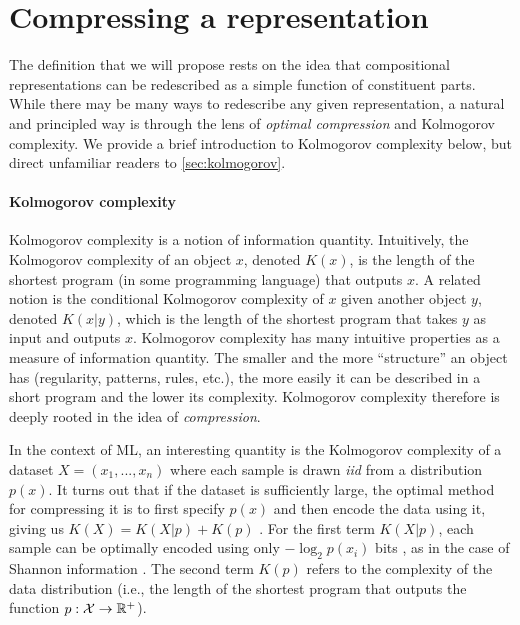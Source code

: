 \documentclass{article} %
\begin{document}
\section{Compressing a representation}
\label{sec:compression}

The definition that we will propose rests on the idea that compositional representations can be redescribed as a simple function of constituent parts. While there may be many ways to redescribe any given representation, a natural and principled way is through the lens of \textit{optimal compression} and Kolmogorov complexity. We provide a brief introduction to Kolmogorov complexity below, but direct unfamiliar readers to \cref{sec:kolmogorov}.

\paragraph{Kolmogorov complexity}

Kolmogorov complexity \citep{li2008introduction,kolmogorov1965three} is a notion of information quantity. Intuitively, the Kolmogorov complexity of an object $x$, denoted $K(x)$, is the length of the shortest program (in some programming language) that outputs $x$. A related notion is the conditional Kolmogorov complexity of $x$ given another object $y$, denoted $K(x|y)$, which is the length of the shortest program that takes $y$ as input and outputs $x$. Kolmogorov complexity has many intuitive properties as a measure of information quantity. The smaller and the more ``structure'' an object has (regularity, patterns, rules, etc.), the more easily it can be described in a short program and the lower its complexity. Kolmogorov complexity therefore is deeply rooted in the idea of \emph{compression}.

In the context of ML, an interesting quantity is the Kolmogorov complexity of a dataset $X = (x_1, ..., x_n)$ where each sample is drawn \textit{iid} from a distribution $p(x)$. It turns out that if the dataset is sufficiently large, the optimal method for compressing it is to first specify $p(x)$ and then encode the data using it, giving us $K(X) = K(X|p) + K(p)$ \citep{fortnow2000kolmogorov}. For the first term $K(X|p)$, each sample can be optimally encoded using only $-\log_2p(x_i)$ bits \citep{witten1987arithmetic}, as in the case of Shannon information \citep{shannon2001mathematical}. The second term $K(p)$ refers to the complexity of the data distribution (i.e., the length of the shortest program that outputs the function $p: \mathcal{X} \rightarrow {\mathbb{R}}^+$).
\end{document}
